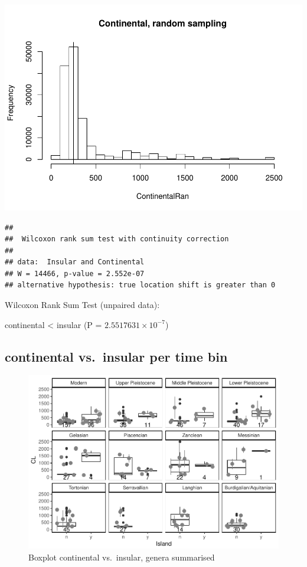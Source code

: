\documentclass[]{article}
\begin{document}
\includegraphics{MA_JJ_files/figure-latex/RSCI-1.pdf}

\begin{verbatim}
## 
##  Wilcoxon rank sum test with continuity correction
## 
## data:  Insular and Continental
## W = 14466, p-value = 2.552e-07
## alternative hypothesis: true location shift is greater than 0
\end{verbatim}

Wilcoxon Rank Sum Test (unpaired data):

continental \textless{} insular (P = \(2.5517631\times 10^{-7}\))

\newpage

\subsection{continental vs.~insular per time
bin}\label{continental-vs.insular-per-time-bin-1}

\begin{figure}[htbp]
\centering
\includegraphics{MA_JJ_files/figure-latex/BPCIBins-1.pdf}
\caption{Boxplot continental vs.~insular, genera summarised}
\end{figure}
\end{document}
